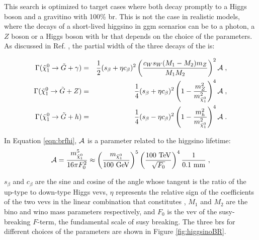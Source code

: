 This search is optimized to target cases where both \hino decay promptly to a Higgs boson and a gravitino with 100\% \gls{br}.
This is not the case in realistic models, where the decays of a short-lived higgsino in \gls{ggm} scenarios  
can be to a photon, a $Z$ boson or a Higgs boson with 
\gls{br} that depends on the choice of the parameters.
As discussed in Ref. \cite{Meade:2009qv}, the partial width of the three decays of the \ninoone is:

\begin{eqnarray}
\label{eqn:brfhi}
\Gamma(\tilde\chi_1^0\to \tilde G+\gamma)&=& {1\over2}(s_\beta+\eta c_\beta)^2\left({c_Ws_W(M_1-M_2)m_Z\over M_1 M_2}\right)^2 {\cal A} \;,
\nonumber\\
 \Gamma(\tilde\chi_1^0\to \tilde G+Z)&=&{1\over4}(s_\beta+\eta c_\beta)^2\left(1 - \frac{m_Z^2}{m^2_{\tilde{\chi}^0_1}}\right)^4 {\cal A} \;,\\
  \Gamma(\tilde\chi_1^0\to \tilde G+h)&=&{1\over4}(s_\beta-\eta c_\beta)^2\left(1 - \frac{m_h^2}{m^2_{\tilde{\chi}^0_1}}\right)^4 {\cal A} \;. \nonumber
\end{eqnarray}

\noindent In Equation \ref{eqn:brfhi}, ${\cal A}$ is a parameter related to the higgsino lifetime:
\begin{equation}
{\cal A} = \frac{m^5_{\tilde{\chi}^0_1}}{16\pi F_0^2} \approx \left(\frac{m_{\tilde{\chi}^0_1}}{100~{\rm GeV}}\right)^5 \left(\frac{100~\rm{TeV}}{\sqrt{F_0}}\right)^4 \frac{1}{0.1~{\rm mm}} \;, \nonumber
\end{equation}

\noindent $s_\beta$ and $c_\beta$ are the sine and cosine of the angle whose tangent is 
the ratio of the up-type to down-type Higgs \glspl{vev}, 
$\eta$ represents the relative sign of the coefficients 
of the two \glspl{vev} in the linear combination that constitutes \ninoone,
$M_1$ and $M_2$ are the bino and wino mass parameters respectively, and 
$F_0$ is the \gls{vev} of the \gls{susy}-breaking $F$-term, the fundamental scale of \gls{susy} breaking.
The three \glspl{br} for different choices of the parameters are shown in Figure \ref{fig:higgsinoBR}.

